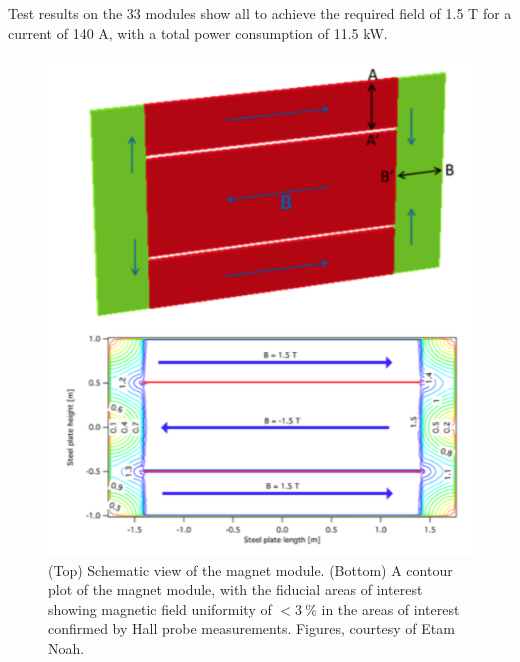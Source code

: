 Test results on the 33 modules show all to achieve the required field of 1.5 T for a current of 140 A, with a total power consumption of 11.5 kW.


\begin{figure}[h!]
\centering
\includegraphics[width=\textwidth]{figures/Mfield.png}
\caption{(Top) Schematic view of the magnet module. (Bottom) A contour plot of the magnet module, with the fiducial areas of interest showing magnetic field uniformity of $< 3~\%$ in the areas of interest confirmed by Hall probe measurements. Figures,  courtesy of Etam Noah.}
\label{fig:mField}
\end{figure}

